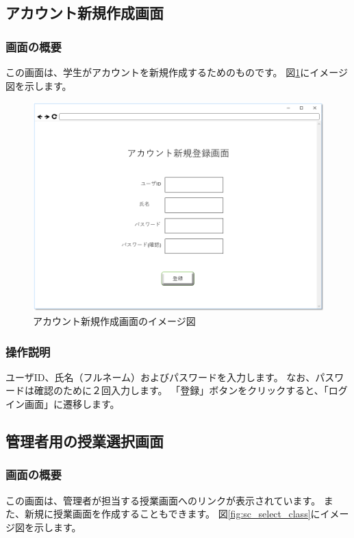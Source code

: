 \newpage

\subsection{アカウント新規作成画面}
\subsubsection{画面の概要}
この画面は、学生がアカウントを新規作成するためのものです。
図\ref{fig:sc_account_creat}にイメージ図を示します。

\begin{figure}[htbp]
  \begin{center}
    \includegraphics[width=1\linewidth,clip]{./img/sc_account_creat.png}
    \caption{アカウント新規作成画面のイメージ図}\label{fig:sc_account_creat}
  \end{center}
\end{figure}

\subsubsection{操作説明}
ユーザID、氏名（フルネーム）およびパスワードを入力します。
なお、パスワードは確認のために２回入力します。
「登録」ボタンをクリックすると、「ログイン画面」に遷移します。

\newpage

\subsection{管理者用の授業選択画面}
\subsubsection{画面の概要}
この画面は、管理者が担当する授業画面へのリンクが表示されています。
また、新規に授業画面を作成することもできます。
図\ref{fig:sc_select_class}にイメージ図を示します。

